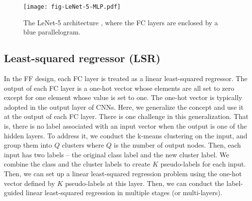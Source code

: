 \documentclass[preprint,12pt]{elsarticle}
\begin{document}
\begin{figure}[htb]
\centering
\texttt{[image: fig-LeNet-5-MLP.pdf]}
\caption{The LeNet-5 architecture \cite{LeNet1998}, where the FC 
layers are enclosed by a blue parallelogram.}\label{fig:LeNet-FC}
\end{figure}

\subsection{Least-squared regressor (LSR)}\label{subsec:l2sr}

In the FF design, each FC layer is treated as a linear least-squared
regressor.  The output of each FC layer is a one-hot vector whose
elements are all set to zero except for one element whose value is set
to one.  The one-hot vector is typically adopted in the output layer of
CNNs. Here, we generalize the concept and use it at the output of each
FC layer.  There is one challenge in this generalization.  That is,
there is no label associated with an input vector when the output is one
of the hidden layers. To address it, we conduct the k-means clustering
on the input, and group them into $Q$ clusters where $Q$ is the number
of output nodes.  Then, each input has two labels -- the original class
label and the new cluster label.  We combine the class and the cluster
labels to create $K$ pseudo-labels for each input. Then, we can set up a
linear least-squared regression problem using the one-hot vector defined
by $K$ pseudo-labels at this layer.  Then, we can conduct the
label-guided linear least-squared regression in multiple stages (or
multi-layers). 
\end{document}
